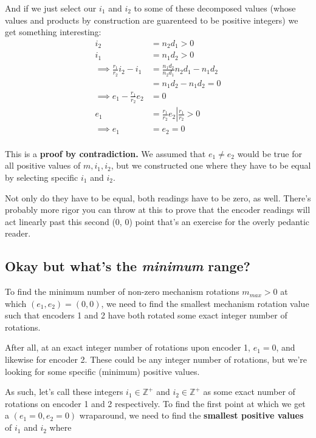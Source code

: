 \documentclass[11pt]{article}
\begin{document}
And if we just select our $i_1$ and $i_2$ to some of these decomposed values (whose values and products by construction are guarenteed to be positive integers) we get something interesting:
\begin{align*}
    i_2 &= n_2d_1 > 0\\
    i_1 &= n_1d_2 > 0\\
    \implies \frac{r_1}{r_2}i_2 - i_1 &= \frac{n_1d_2}{n_2d_1}n_2d_1 - n_1d_2\\
    &= n_1d_2 - n_1d_2 = 0\\
    \implies e_1 - \frac{r_1}{r_2}e_2 &= 0\\
    e_1 &= \left.\frac{r_1}{r_2}e_2 \right| \frac{r_1}{r_2} > 0\\
    \implies e_1 &= e_2 = 0\\
\end{align*}

This is a \textbf{proof by contradiction.} We assumed that $e_1 \neq e_2$ would be true for all positive values of $m, i_1, i_2$, but we constructed one where they have to be equal by selecting specific $i_1$ and $i_2$. 

Not only do they have to be equal, both readings have to be zero, as well.
There's probably more rigor you can throw at this to prove that the encoder readings will act linearly past this second (0, 0) point that's an exercise for the overly pedantic reader.

\subsection{Okay but what's the \textit{minimum} range?}


To find the minimum number of non-zero mechanism rotations $m_{max} > 0$ at which $(e_1, e_2) = (0, 0)$, we need to find the smallest mechanism rotation value such that encoders 1 and 2 have both rotated some exact integer number of rotations.

After all, at an exact integer number of rotations upon encoder 1, $e_1 = 0$, and likewise for encoder 2.
These could be any integer number of rotations, but we're looking for some specific (minimum) positive values.

As such, let's call these integers $i_1 \in \mathbb{Z^+}$ and $i_2 \in {\mathbb{Z^+}}$ as some exact number of rotations on encoder 1 and 2 respectively. 
To find the first point at which we get a $(e_1 = 0, e_2 = 0)$ wraparound, we need to find the \textbf{smallest positive values} of $i_1$ and $i_2$ where 
\end{document}
